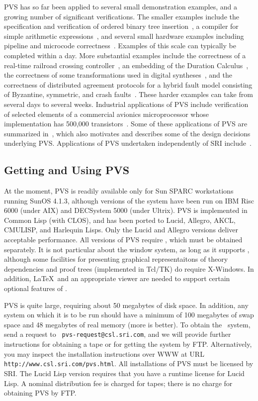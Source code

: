 PVS has so far been applied to several small demonstration examples,
and a growing number of significant verifications.  The smaller
examples include the specification and verification of ordered binary
tree insertion~\cite{Shankar:ADT}, a compiler for simple arithmetic
expressions~\cite{Rushby95:Movie}, and several small hardware examples
including pipeline and microcode correctness~\cite{Cyrluk94:TPCD}.
Examples of this scale can typically be completed within a day.  More
substantial examples include the correctness of a real-time railroad
crossing controller~\cite{Shankar93:CAV}, an embedding of the Duration
Calculus~\cite{Skakkebaek&Shankar94}, the correctness of some
transformations used in digital syntheses~\cite{Sree94:TR}, and the
correctness of distributed agreement protocols for a hybrid fault
model consisting of Byzantine, symmetric, and crash
faults~\cite{Lincoln&Rushby93:CAV,Lincoln&Rushby93:FTCS,Lincoln&Rushby94:FTP}.
These harder examples can take from several days to several weeks.
Industrial applications of PVS include verification of selected
elements of a commercial avionics microprocessor whose implementation
has 500,000 transistors~\cite{Miller&Srivas95}.
Some of these applications of PVS are summarized
in~\cite{Owre95:prolegomena}, which also
motivates and describes
some of the design decisions underlying PVS\@.
Applications of PVS undertaken independently of SRI
include~\cite{Hooman94,Butler:PVS-tut,Johnson94:TPCD,Miner94:circuit}.

\subsection{Getting and Using PVS}

At the moment, PVS is readily available only for Sun SPARC
workstations running SunOS 4.1.3, although versions of the system have
been run on IBM Risc 6000 (under AIX) and DECSystem 5000 (under
Ultrix).  PVS is implemented in Common Lisp (with CLOS), and has been
ported to Lucid, Allegro, AKCL, CMULISP, and Harlequin Lisps.
Only the Lucid and Allegro versions deliver acceptable performance.
All versions of PVS require \gnuemacs, which must be obtained
separately.  It is not particular about the window system, as long as
it supports \gnuemacs, although some facilities for presenting
graphical representaitons of theory dependencies and proof trees
(implemented in Tcl/TK) do require X-Windows.  In addition, \LaTeX\
and an appropriate viewer are needed to support certain optional
features of \pvs.

PVS is quite large, requiring about 50 megabytes of disk space.  In
addition, any system on which it is to be run should have a minimum of
100 megabytes of swap space and 48 megabytes of real memory (more is
better).  To obtain the \pvs\ system, send a request to {\tt
pvs-request@csl.sri.com}, and we will provide further instructions for
obtaining a tape or for getting the system by FTP\@.  Alternatively,
you may inspect the installation instructions over WWW at URL {\tt
http://www.csl.sri.com/pvs.html}.  All installations of PVS must be
licensed by SRI\@.  The Lucid Lisp version requires that you have a
runtime license for Lucid Lisp.  A nominal distribution fee is charged
for tapes; there is no charge for obtaining PVS by FTP.
